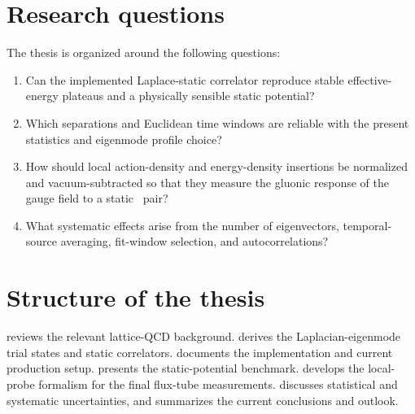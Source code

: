 \section{Research questions}
The thesis is organized around the following questions:
\begin{enumerate}
  \item Can the implemented Laplace-static correlator reproduce stable effective-energy plateaus and a physically sensible static potential?
  \item Which separations and Euclidean time windows are reliable with the present statistics and eigenmode profile choice?
  \item How should local action-density and energy-density insertions be normalized and vacuum-subtracted so that they measure the gluonic response of the gauge field to a static \QQbar\ pair?
  \item What systematic effects arise from the number of eigenvectors, temporal-source averaging, fit-window selection, and autocorrelations?
\end{enumerate}

\section{Structure of the thesis}
 reviews the relevant lattice-QCD background.  derives the Laplacian-eigenmode trial states and static correlators.  documents the implementation and current production setup.  presents the static-potential benchmark.  develops the local-probe formalism for the final flux-tube measurements.  discusses statistical and systematic uncertainties, and  summarizes the current conclusions and outlook.
